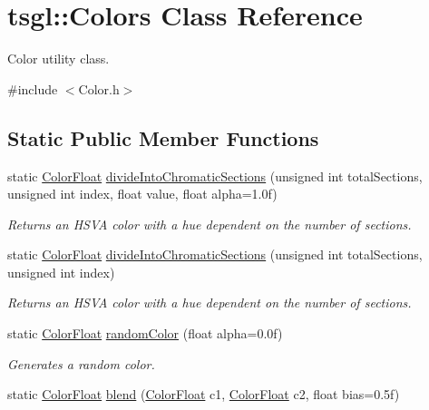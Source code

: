\hypertarget{classtsgl_1_1_colors}{\section{tsgl\-:\-:\-Colors \-Class \-Reference}
\label{classtsgl_1_1_colors}
}


\-Color utility class.  




{\ttfamily \#include $<$\-Color.\-h$>$}

\subsection*{\-Static \-Public \-Member \-Functions}
\begin{DoxyCompactItemize}
\item 
static \hyperlink{structtsgl_1_1_color_float}{\-Color\-Float} \hyperlink{classtsgl_1_1_colors_af610e20b5176294e24fdae4af4f5d6dc}{divide\-Into\-Chromatic\-Sections} (unsigned int total\-Sections, unsigned int index, float value, float alpha=1.\-0f)
\begin{DoxyCompactList}\small\item\em \-Returns an \-H\-S\-V\-A color with a hue dependent on the number of sections. \end{DoxyCompactList}\item 
static \hyperlink{structtsgl_1_1_color_float}{\-Color\-Float} \hyperlink{classtsgl_1_1_colors_ab9c66054f181ca5db5839ede985fb112}{divide\-Into\-Chromatic\-Sections} (unsigned int total\-Sections, unsigned int index)
\begin{DoxyCompactList}\small\item\em \-Returns an \-H\-S\-V\-A color with a hue dependent on the number of sections. \end{DoxyCompactList}\item 
static \hyperlink{structtsgl_1_1_color_float}{\-Color\-Float} \hyperlink{classtsgl_1_1_colors_a0f28a13af4a0fc352a250c23ecc97e4f}{random\-Color} (float alpha=0.\-0f)
\begin{DoxyCompactList}\small\item\em \-Generates a random color. \end{DoxyCompactList}\item 
static \hyperlink{structtsgl_1_1_color_float}{\-Color\-Float} \hyperlink{classtsgl_1_1_colors_a26a34b86c0b70fe4984a91a24a0f263f}{blend} (\hyperlink{structtsgl_1_1_color_float}{\-Color\-Float} c1, \hyperlink{structtsgl_1_1_color_float}{\-Color\-Float} c2, float bias=0.\-5f)

\end{DoxyCompactItemize}
